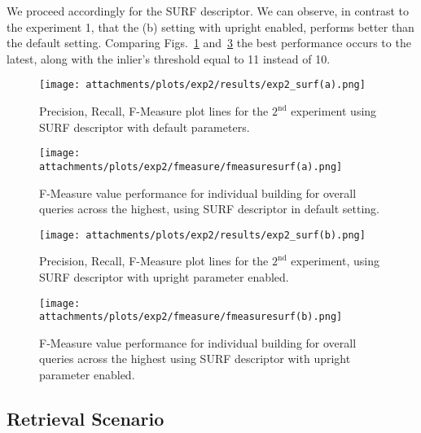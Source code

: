 	 We proceed accordingly for the SURF descriptor. We can observe, in contrast to the experiment 1, that the (b) setting with upright enabled, performs better than the default setting. Comparing Figs.~\ref{fig:exp2_surf_a} and~\ref{fig:exp2_surf_b} the best performance occurs to the latest, along with the inlier's threshold equal to 11 instead of 10.
	 
            \begin{figure}[H]	%
              \centering
              \texttt{[image: attachments/plots/exp2/results/exp2\_surf(a).png]}
              \caption{ Precision, Recall, F-Measure plot lines for the $2^\text{nd}$ experiment using SURF descriptor with default parameters.}
              \label{fig:exp2_surf_a}
	    \end{figure}
           
            \begin{figure}[H] %
              \centering
              \texttt{[image: attachments/plots/exp2/fmeasure/fmeasuresurf(a).png]}
              \caption{F-Measure value performance for individual building for overall queries across the highest, using SURF descriptor in default setting.}
              \label{fig:exp2_surfa_fm}
            \end{figure}
           
            \begin{figure}[ht!]
              \centering
              \texttt{[image: attachments/plots/exp2/results/exp2\_surf(b).png]}
              \caption{ Precision, Recall, F-Measure plot lines for the $2^\text{nd}$ experiment, using SURF descriptor with upright parameter enabled.}
              \label{fig:exp2_surf_b}
            \end{figure} 
            
            \begin{figure}[H]
              \centering
              \texttt{[image: attachments/plots/exp2/fmeasure/fmeasuresurf(b).png]}
              \caption{F-Measure value performance for individual building for overall queries across the highest using SURF descriptor with upright parameter enabled.}
              \label{fig:exp2_surfb_fm}
            \end{figure}            
    \newpage
    \subsection{Retrieval Scenario}\label{retrieval_scenario} %
    
